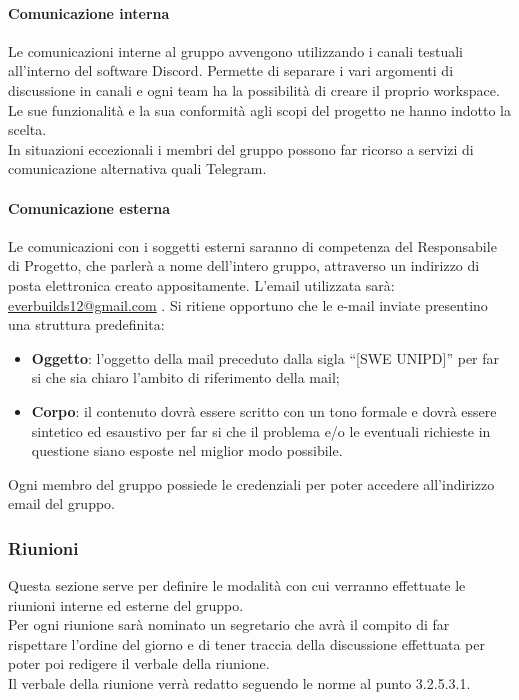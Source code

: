 			\paragraph{Comunicazione interna}
				Le comunicazioni interne al gruppo avvengono utilizzando i canali testuali all’interno del software Discord. Permette di separare i vari argomenti di discussione in canali e ogni team ha la possibilità di creare il proprio workspace.\\
				Le sue funzionalità e la sua conformità agli scopi del progetto ne hanno indotto la scelta.\\
				In situazioni eccezionali i membri del gruppo possono far ricorso a servizi di comunicazione alternativa quali Telegram.\\
			\paragraph{Comunicazione esterna}
				Le comunicazioni con i soggetti esterni saranno di competenza del Responsabile di Progetto, che parlerà a nome dell’intero gruppo, attraverso un indirizzo di posta elettronica creato appositamente. L’email utilizzata sarà: \url{everbuilds12@gmail.com} .
				Si ritiene opportuno che le e-mail inviate presentino una struttura predefinita:
				\begin{itemize}
					\item\textbf{Oggetto}: l’oggetto della mail preceduto dalla sigla “[SWE UNIPD]” per far si che sia chiaro l’ambito di riferimento della mail;
					\item\textbf{Corpo}: il contenuto dovrà essere scritto con un tono formale e dovrà essere sintetico ed esaustivo per far si che il problema e/o le eventuali richieste in questione siano esposte nel miglior modo possibile.
				\end{itemize}
				Ogni membro del gruppo possiede le credenziali per poter accedere all’indirizzo email del gruppo.
		\subsubsection{Riunioni}
			Questa sezione serve per definire le modalità con cui verranno effettuate le riunioni interne ed esterne del gruppo. \\
			Per ogni riunione sarà nominato un segretario che avrà il compito di far rispettare l’ordine del giorno e di tener traccia della discussione effettuata per poter poi redigere il verbale della riunione.\\
			Il verbale della riunione verrà redatto seguendo le norme al punto 3.2.5.3.1.\\
